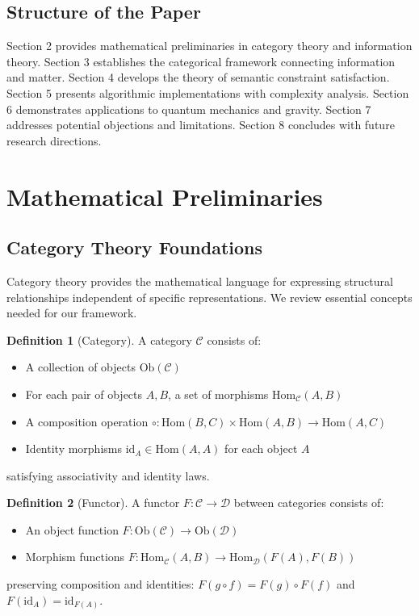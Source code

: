 \documentclass[11pt]{article}
\theoremstyle{definition}
\newtheorem{definition}{Definition}[section]
\newcommand{\id}{\text{id}}
\begin{document}
\subsection{Structure of the Paper}

Section 2 provides mathematical preliminaries in category theory and information theory. Section 3 establishes the categorical framework connecting information and matter. Section 4 develops the theory of semantic constraint satisfaction. Section 5 presents algorithmic implementations with complexity analysis. Section 6 demonstrates applications to quantum mechanics and gravity. Section 7 addresses potential objections and limitations. Section 8 concludes with future research directions.

\section{Mathematical Preliminaries}

\subsection{Category Theory Foundations}

Category theory provides the mathematical language for expressing structural relationships independent of specific representations. We review essential concepts needed for our framework.

\begin{definition}[Category]
A category $\mathcal{C}$ consists of:
\begin{itemize}
\item A collection of objects $\text{Ob}(\mathcal{C})$
\item For each pair of objects $A, B$, a set of morphisms $\text{Hom}_{\mathcal{C}}(A, B)$
\item A composition operation $\circ: \text{Hom}(B, C) \times \text{Hom}(A, B) \to \text{Hom}(A, C)$
\item Identity morphisms $\id_A \in \text{Hom}(A, A)$ for each object $A$
\end{itemize}
satisfying associativity and identity laws.
\end{definition}

\begin{definition}[Functor]
A functor $F: \mathcal{C} \to \mathcal{D}$ between categories consists of:
\begin{itemize}
\item An object function $F: \text{Ob}(\mathcal{C}) \to \text{Ob}(\mathcal{D})$
\item Morphism functions $F: \text{Hom}_{\mathcal{C}}(A, B) \to \text{Hom}_{\mathcal{D}}(F(A), F(B))$
\end{itemize}
preserving composition and identities: $F(g \circ f) = F(g) \circ F(f)$ and $F(\id_A) = \id_{F(A)}$.
\end{definition}
\end{document}
